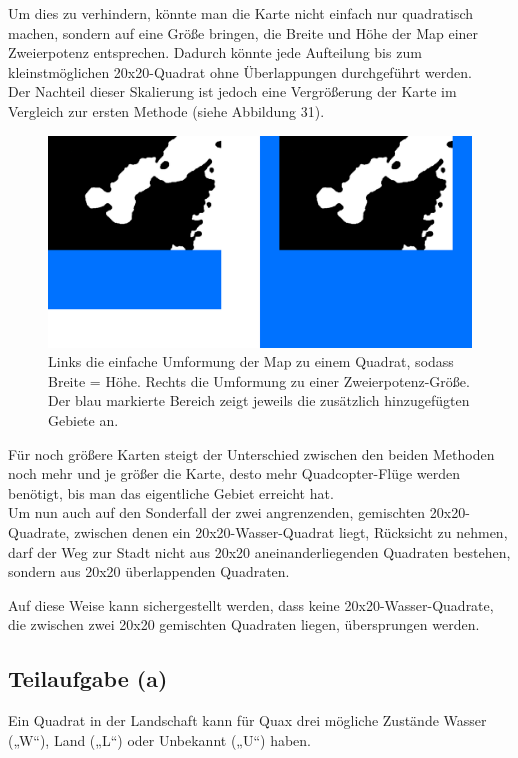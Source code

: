 \documentclass[a4paper,12pt]{article}
\begin{document}
Um dies zu verhindern, könnte man die Karte nicht einfach nur quadratisch machen, sondern auf eine Größe bringen, die Breite und Höhe der Map einer Zweierpotenz entsprechen. Dadurch könnte jede Aufteilung bis zum kleinstmöglichen 20x20-Quadrat ohne Überlappungen durchgeführt werden.
\\[0.4cm]
Der Nachteil dieser Skalierung ist jedoch eine Vergrößerung der Karte im Vergleich zur ersten Methode (siehe Abbildung 31).
\begin{figure}[H]
\centering
    \includegraphics[width=.9\linewidth]{Bilder/Aufgabe3/Erweiterung_Karte.png}
    \caption{Links die einfache Umformung der Map zu einem Quadrat, sodass Breite = Höhe. Rechts die Umformung zu einer Zweierpotenz-Größe. Der blau markierte Bereich zeigt jeweils die zusätzlich hinzugefügten Gebiete an.}
\end{figure}

Für noch größere Karten steigt der Unterschied zwischen den beiden Methoden noch mehr und je größer die Karte, desto mehr Quadcopter-Flüge werden benötigt, bis man das eigentliche Gebiet erreicht hat.
\\[0.4cm]
Um nun auch auf den Sonderfall der zwei angrenzenden, gemischten 20x20-Quadrate, zwischen denen ein 20x20-Wasser-Quadrat liegt, Rücksicht zu nehmen, darf der Weg zur Stadt nicht aus 20x20 aneinanderliegenden Quadraten bestehen, sondern aus 20x20 überlappenden Quadraten.

Auf diese Weise kann sichergestellt werden, dass keine 20x20-Wasser-Quadrate, die zwischen zwei 20x20 gemischten Quadraten liegen, übersprungen werden.

\subsection{Teilaufgabe (a)}
Ein Quadrat in der Landschaft kann für Quax drei mögliche Zustände Wasser („W“), Land („L“) oder Unbekannt („U“) haben.
\end{document}
